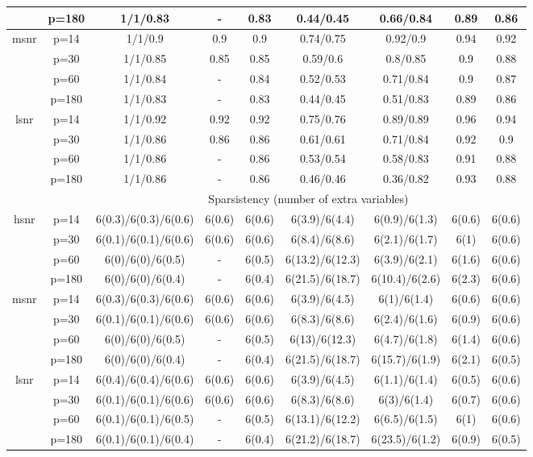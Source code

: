 \begin{table}[ht]
{\begin{tabular}{|c|c|ccccccc|}
   & p=180 & 1/1/0.83 & - & 0.83 & 0.44/0.45 & 0.66/0.84 & 0.89 & 0.86 \\ 
  \midrule\multirow{4}[2]{*}{msnr} & p=14 & 1/1/0.9 & 0.9 & 0.9 & 0.74/0.75 & 0.92/0.9 & 0.94 & 0.92 \\ 
   & p=30 & 1/1/0.85 & 0.85 & 0.85 & 0.59/0.6 & 0.8/0.85 & 0.9 & 0.88 \\ 
   & p=60 & 1/1/0.84 & - & 0.84 & 0.52/0.53 & 0.71/0.84 & 0.9 & 0.87 \\ 
   & p=180 & 1/1/0.83 & - & 0.83 & 0.44/0.45 & 0.51/0.83 & 0.89 & 0.86 \\ 
  \midrule\multirow{4}[2]{*}{lsnr} & p=14 & 1/1/0.92 & 0.92 & 0.92 & 0.75/0.76 & 0.89/0.89 & 0.96 & 0.94 \\ 
   & p=30 & 1/1/0.86 & 0.86 & 0.86 & 0.61/0.61 & 0.71/0.84 & 0.92 & 0.9 \\ 
   & p=60 & 1/1/0.86 & - & 0.86 & 0.53/0.54 & 0.58/0.83 & 0.91 & 0.88 \\ 
   & p=180 & 1/1/0.86 & - & 0.86 & 0.46/0.46 & 0.36/0.82 & 0.93 & 0.88 \\ 
   \midrule 
 \multicolumn{1}{|c}{} &       & \multicolumn{7}{c|}{Sparsistency (number of extra variables)} \\
\midrule\multirow{4}[2]{*}{hsnr} & p=14 & 6(0.3)/6(0.3)/6(0.6) & 6(0.6) & 6(0.6) & 6(3.9)/6(4.4) & 6(0.9)/6(1.3) & 6(0.6) & 6(0.6) \\ 
   & p=30 & 6(0.1)/6(0.1)/6(0.6) & 6(0.6) & 6(0.6) & 6(8.4)/6(8.6) & 6(2.1)/6(1.7) & 6(1) & 6(0.6) \\ 
   & p=60 & 6(0)/6(0)/6(0.5) & - & 6(0.5) & 6(13.2)/6(12.3) & 6(3.9)/6(2.1) & 6(1.6) & 6(0.6) \\ 
   & p=180 & 6(0)/6(0)/6(0.4) & - & 6(0.4) & 6(21.5)/6(18.7) & 6(10.4)/6(2.6) & 6(2.3) & 6(0.6) \\ 
  \midrule\multirow{4}[2]{*}{msnr} & p=14 & 6(0.3)/6(0.3)/6(0.6) & 6(0.6) & 6(0.6) & 6(3.9)/6(4.5) & 6(1)/6(1.4) & 6(0.6) & 6(0.6) \\ 
   & p=30 & 6(0.1)/6(0.1)/6(0.6) & 6(0.6) & 6(0.6) & 6(8.3)/6(8.6) & 6(2.4)/6(1.6) & 6(0.9) & 6(0.6) \\ 
   & p=60 & 6(0)/6(0)/6(0.5) & - & 6(0.5) & 6(13)/6(12.3) & 6(4.7)/6(1.8) & 6(1.4) & 6(0.6) \\ 
   & p=180 & 6(0)/6(0)/6(0.4) & - & 6(0.4) & 6(21.5)/6(18.7) & 6(15.7)/6(1.9) & 6(2.1) & 6(0.5) \\ 
  \midrule\multirow{4}[2]{*}{lsnr} & p=14 & 6(0.4)/6(0.4)/6(0.6) & 6(0.6) & 6(0.6) & 6(3.9)/6(4.5) & 6(1.1)/6(1.4) & 6(0.5) & 6(0.6) \\ 
   & p=30 & 6(0.1)/6(0.1)/6(0.6) & 6(0.6) & 6(0.6) & 6(8.3)/6(8.6) & 6(3)/6(1.4) & 6(0.7) & 6(0.6) \\ 
   & p=60 & 6(0.1)/6(0.1)/6(0.5) & - & 6(0.5) & 6(13.1)/6(12.2) & 6(6.5)/6(1.5) & 6(1) & 6(0.6) \\ 
   & p=180 & 6(0.1)/6(0.1)/6(0.4) & - & 6(0.4) & 6(21.2)/6(18.7) & 6(23.5)/6(1.2) & 6(0.9) & 6(0.5) \\ 
   \bottomrule 
\end{tabular}
}
\end{table}
